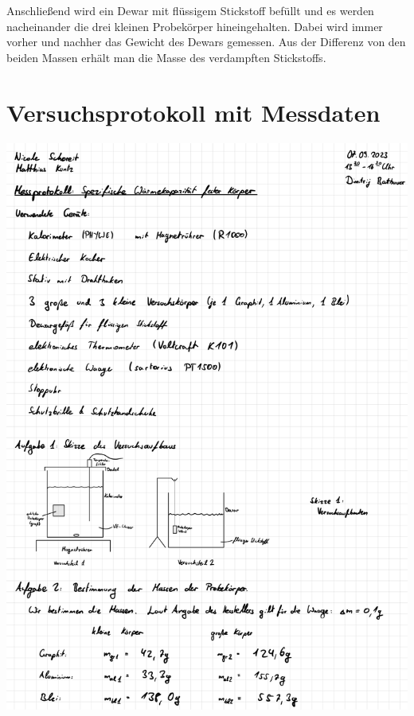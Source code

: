 \documentclass{article}
\begin{document}
Anschließend wird ein Dewar mit flüssigem Stickstoff befüllt und es werden nacheinander die drei kleinen Probekörper hineingehalten. Dabei wird immer vorher und nachher das Gewicht des Dewars gemessen. Aus der Differenz von den beiden Massen erhält man die Masse des verdampften Stickstoffs.

\newpage

\section{Versuchsprotokoll mit Messdaten}

\includegraphics[width=\textwidth]{graphics/mess1.jpg}
\newpage
\end{document}
